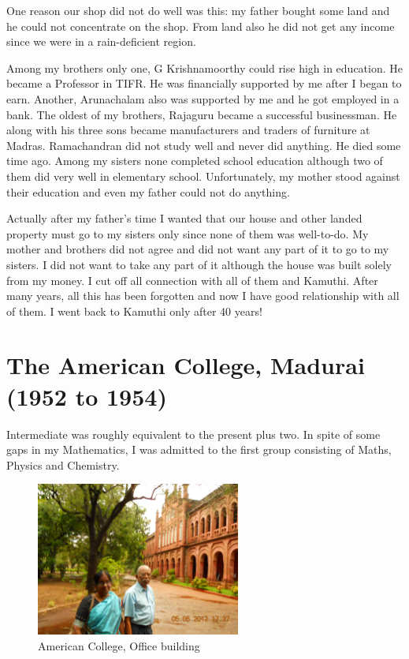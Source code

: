 One reason our shop did not do well was this: my father bought some land 
and he could not concentrate on the shop. From land also he did not get 
any income since we were in a rain-deficient region.

Among my brothers only one, G Krishnamoorthy could rise high in 
education. He became a Professor in TIFR. He was financially supported 
by me after I began to earn. Another, Arunachalam also was supported by 
me and he got employed in a bank. The oldest of my brothers, Rajaguru 
became a successful businessman. He along with his three sons became 
manufactu\-rers and traders of furniture at Madras. Ramachandran did not 
study well and never did anything. He died some time ago. Among my 
sisters none completed school education although two of them did very 
well in elementary school. Unfortunately, my mother stood against their 
education and even my father could not do anything.

Actually after my father's time I wanted that our house and other landed 
property must go to my sisters only since none of them was well-to-do.  
My mother and brothers did not agree and did not want any part of it to 
go to my sisters. I did not want to take any part of it although the 
house was built solely from my money. I cut off all connection with all 
of them and Kamuthi. After many years, all this has been forgotten and 
now I have good relationship with all of them. I went back to Kamuthi 
only after 40 years!

\vspace{-\topsep}
\section*{The American College, Madurai (1952 to 1954)}
\vspace{-\topsep}
Intermediate was roughly equivalent to the present plus two. In spite of 
some gaps in my Mathematics, I was admitted to the first group 
consisting of Maths, Physics and Chemistry.

\vspace{-\topsep}
\begin{figure}[H]
\centering
\includegraphics[width=0.6\textwidth]{images/new-images/05-Rajaji-AC.jpg}
\caption{\small{American College, Office building}}
\end{figure}
\vspace{-\topsep}


